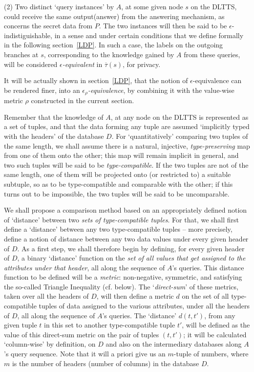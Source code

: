 \documentclass[pdflatex]{article}
\def \otau {\overline{\tau}}
\begin{document}
 (2)  Two distinct `query instances' by $A$, at some  given node $s$ on the DLTTS, 
 could receive the  same output(answer) from the answering  mechanism, as concerns
 the secret data from $P$. The two  instances will then be said to be
 $\epsilon$-indistiguishable, in a sense  and under certain conditions that  we define
 formally in the  following  section~\ref{LDP}. In such a  case, the labels on the
 outgoing branches at $s$,  corresponding to  the knowledge gained by $A$ from
 these queries, will be  considered  {\em $\epsilon$-equivalent} in $\otau(s)$,  for privacy. 

It will be actually shown in  section~\ref{LDP}, that the notion of $\epsilon$-equivalence
 can be rendered  finer, into an {\em $\epsilon_{\rho}$-equivalence}, by  combining it
 with the value-wise metric $\rho$ constructed  in the current section. 
 
 
Remember that  the knowledge of $A$, at any node on the DLTTS is 
represented  as a set of tuples, and  that the data forming  any tuple are
assumed `implicitly typed with  the headers' of the  database $D$.
For `quantitatively' comparing two tuples of the same length,  we shall  assume
there is a natural, injective, {\em type-preserving}  map from  one of them onto
the other; this map will  remain  implicit  in general, and two such  tuples will be
said to be {\em type-compatible}. If the two tuples are not of  the same length,
 one of them will be projected onto (or restricted to) a suitable  subtuple, so as to 
 be type-compatible and comparable with the other; if this turns out  to be impossible,
 the two tuples will be said to be uncomparable. 
 

 We shall propose a  comparison method based on an appropriately defined
 notion of `distance'  between  two {\em sets of type-compatible  tuples}.
 For that, we shall first  define  a `distance' between any two type-compatible
 tuples -- more precisely, define a  notion of distance between any two data
 values under every given header of $D$.
 As a first step, we  shall therefore begin by defining, for every given  header  of
 $D$, a binary `distance'  function on the {\em set of all values  that get  assigned
   to the attributes under that header}, all  along the sequence of $A$'s  queries.
 This distance function  to be defined will be a {\em metric}: non-negative,
 symmetric,  and satisfying the  so-called  Triangle  Inequality (cf. below).
 The `{\em direct-sum}' of these metrics, taken over  all the headers of $D$,
 will then define a metric $d$ on the set of all  type-compatible  tuples  of data
 assigned to the various attributes, under all the headers of $D$, all along the
 sequence of  $A$'s queries.
 The `distance'  $d(t, t')$, from any given tuple $t$  in this set to another
 type-compatible  tuple $t'$,  will be  defined as the value of  this direct-sum 
 metric on the pair of tuples $(t, t')$; it will be calculated  `column-wise' by 
 definition, on $D$ and also on the intermediary databases along  $A$'s
 query sequence. Note that it will a priori give us an $m$-tuple of numbers,
 where  $m$ is the  number  of headers (number of columns) in the
 database $D$.
\end{document}
